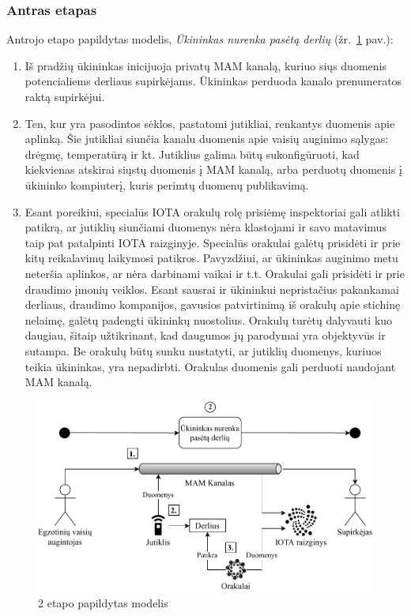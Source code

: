 \subsubsection{Antras etapas} \label{subsection:uc-2}

Antrojo etapo papildytas modelis, \textit{Ūkininkas nurenka pasėtą derlių} (žr.~\ref{img:13} pav.):
\begin{enumerate}
    \item Iš pradžių ūkininkas inicijuoja privatų MAM kanalą, kuriuo siųs duomenis potencialiems derliaus supirkėjams. Ūkininkas perduoda kanalo prenumeratos raktą supirkėjui.
    \item Ten, kur yra pasodintos sėklos, pastatomi jutikliai, renkantys duomenis apie aplinką. Šie jutikliai siunčia kanalu duomenis apie vaisių auginimo sąlygas: drėgmę, temperatūrą ir kt. Jutiklius galima būtų sukonfigūruoti, kad kiekvienas atskirai siųstų duomenis į MAM kanalą, arba perduotų duomenis į ūkininko kompiuterį, kuris perimtų duomenų publikavimą.
    \item Esant poreikiui, specialūs IOTA orakulų rolę prisiėmę inspektoriai gali atlikti patikrą, ar jutiklių siunčiami duomenys nėra klastojami ir savo matavimus taip pat patalpinti IOTA raizginyje. Specialūs orakulai galėtų prisidėti ir prie kitų reikalavimų laikymosi patikros. Pavyzdžiui, ar ūkininkas auginimo metu neteršia aplinkos, ar nėra darbinami vaikai ir t.t. Orakulai gali prisidėti ir prie draudimo įmonių veiklos. Esant sausrai ir ūkininkui nepristačius pakankamai derliaus, draudimo kompanijos, gavusios patvirtinimą iš orakulų apie stichinę nelaimę, galėtų padengti ūkininkų nuostolius. Orakulų turėtų dalyvauti kuo daugiau, šitaip užtikrinant, kad daugumos jų parodymai yra objektyvūs ir sutampa. Be orakulų būtų sunku nustatyti, ar jutiklių duomenys, kuriuos teikia ūkininkas, yra nepadirbti. Orakulas duomenis gali perduoti naudojant MAM kanalą.
\end{enumerate}

\begin{figure}[H]
    \centering
    \includegraphics[scale=0.82]{images/iota-usecase-2}
    \caption{2 etapo papildytas modelis}
    \label{img:13}
\end{figure}



